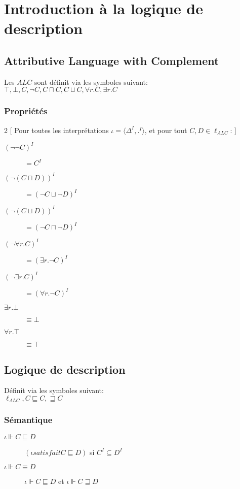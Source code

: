\chapter{Introduction à la logique de description}\pagebreak
\section{Attributive Language with Complement}

Les $ALC$ sont définit via les symboles suivant:\\
$\top, \bot, C, \neg C, C \sqcap C, C \sqcup C, \forall r.C, \exists r.C$\\

\subsection{Propriétés}
\begin{multicols}{2}
[
Pour toutes les interprétations $\iota = \langle \Delta^I, .^I \rangle$, et pour tout $C,D \in \ell_{ALC}$:
]
\begin{description}
\item[$(\neg \neg C)^I$] $= C^I$
\item[$(\neg (C \sqcap D))^I$] $= ( \neg C \sqcup \neg D)^I$
\item[$(\neg (C \sqcup D))^I$] $= ( \neg C \sqcap \neg D)^I$
\item[$(\neg \forall r.C)^I$] $= (\exists r.\neg C)^I$
\item[$(\neg \exists r.C)^I$] $= (\forall r.\neg C)^I$
\item[$\exists r. \bot $] $\equiv \bot $
\item[$\forall r. \top $] $\equiv \top $
\end{description}
\end{multicols}

\section{Logique de description}
Définit via les symboles suivant:\\
$\ell_{ALC}, C \sqsubseteq C, \sqsupseteq C$\\

\subsection{Sémantique}
\begin{description}
\item[$\iota \Vdash C \sqsubseteq D$] $(\iota satisfait C \sqsubseteq D)$ si $C^I \subseteq D^I$
\item[$\iota \Vdash C \equiv D$] $\iota \Vdash C \sqsubseteq D$ et $\iota \Vdash C \sqsupseteq D$
\end{description}

